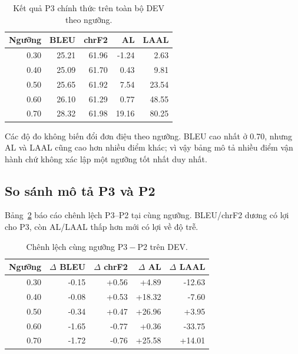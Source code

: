 \documentclass[11pt,a4paper]{article}
\numberwithin{figure}{section}
\numberwithin{table}{section}
\begin{document}
\begin{table}[!htbp]
  \centering
  \caption{Kết quả P3 chính thức trên toàn bộ DEV theo ngưỡng.}
  \label{tab:p3-dev}
  \begin{tabular}{@{}rrrrr@{}}
    \toprule
    \textbf{Ngưỡng} & \textbf{BLEU} & \textbf{chrF2} & \textbf{AL} & \textbf{LAAL} \\
    \midrule
    0.30 & 25.21 & 61.96 & -1.24 & 2.63 \\
    0.40 & 25.09 & 61.70 & 0.43 & 9.81 \\
    0.50 & 25.65 & 61.92 & 7.54 & 23.54 \\
    0.60 & 26.10 & 61.29 & 0.77 & 48.55 \\
    0.70 & 28.32 & 61.98 & 19.16 & 80.25 \\
    \bottomrule
  \end{tabular}
\end{table}

Các độ đo không biến đổi đơn điệu theo ngưỡng. BLEU cao nhất ở 0.70, nhưng AL và LAAL cũng cao hơn nhiều điểm khác; vì vậy bảng mô tả nhiều điểm vận hành chứ không xác lập một ngưỡng tốt nhất duy nhất.

\subsection{So sánh mô tả P3 và P2}
Bảng~\ref{tab:p3-p2-deltas} báo cáo chênh lệch P3--P2 tại cùng ngưỡng. BLEU/chrF2 dương có lợi cho P3, còn AL/LAAL thấp hơn mới có lợi về độ trễ.

\begin{table}[!htbp]
  \centering
  \caption{Chênh lệch cùng ngưỡng $\mathrm{P3}-\mathrm{P2}$ trên DEV.}
  \label{tab:p3-p2-deltas}
  \begin{tabular}{@{}rrrrr@{}}
    \toprule
    \textbf{Ngưỡng} & $\Delta$ \textbf{BLEU} & $\Delta$ \textbf{chrF2} & $\Delta$ \textbf{AL} & $\Delta$ \textbf{LAAL} \\
    \midrule
    0.30 & -0.15 & +0.56 & +4.89 & -12.63 \\
    0.40 & -0.08 & +0.53 & +18.32 & -7.60 \\
    0.50 & -0.34 & +0.47 & +26.96 & +3.95 \\
    0.60 & -1.65 & -0.77 & +0.36 & -33.75 \\
    0.70 & -1.72 & -0.76 & +25.58 & +14.01 \\
    \bottomrule
  \end{tabular}
\end{table}
\end{document}
